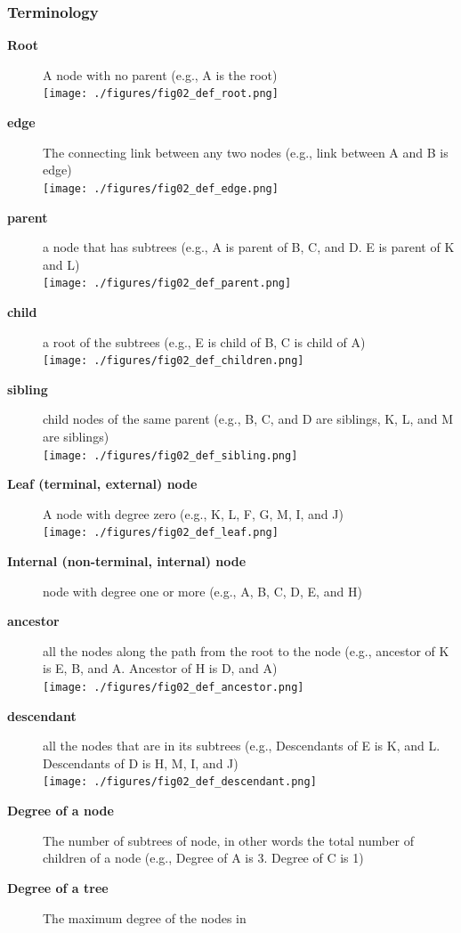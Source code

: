 \documentclass[newPxFont,sthlmFooter,nooffset]{beamer}
\begin{document}
\begin{frame}[t, allowframebreaks]
  \frametitle{Terminology}
  \begin{description}
  \item[\textbf{Root}] A node with no parent (e.g., A is the root)\\
\texttt{[image: ./figures/fig02\_def\_root.png]}
  \item[\textbf{edge}] The connecting link between any two nodes (e.g., link between A and B is edge)\\
\texttt{[image: ./figures/fig02\_def\_edge.png]}
  \item[\textbf{parent}] a node that has subtrees (e.g., A is parent of B, C, and D. E is parent of K and L)\\
\texttt{[image: ./figures/fig02\_def\_parent.png]}
  \item[\textbf{child}] a root of the subtrees (e.g., E is child of B, C is child of A)\\
\texttt{[image: ./figures/fig02\_def\_children.png]}
  \item[\textbf{sibling}] child nodes of the same parent (e.g., B, C, and D are siblings, K, L, and M are siblings)\\
\texttt{[image: ./figures/fig02\_def\_sibling.png]}
  \item[\textbf{Leaf (terminal, external) node}] A node with degree
    zero (e.g., K, L, F, G, M, I, and J)\\
\texttt{[image: ./figures/fig02\_def\_leaf.png]}
  \item[\textbf{Internal (non-terminal, internal) node}] node with
    degree one or more (e.g., A, B, C, D, E, and H)
  \item[\textbf{ancestor}] all the nodes along the path from the root
    to the node (e.g., ancestor of K is E, B, and A. Ancestor of H
    is D, and A)\\
\texttt{[image: ./figures/fig02\_def\_ancestor.png]}
  \item[\textbf{descendant}] all the nodes that are in its subtrees
    (e.g., Descendants of E is K, and L. Descendants of D is H,
    M, I, and J)\\
\texttt{[image: ./figures/fig02\_def\_descendant.png]}
  \item[\textbf{Degree of a node}] The number of subtrees of node, in
    other words the total number of children of a node (e.g., Degree
    of A is 3. Degree of C is 1)
  \item[\textbf{Degree of a tree}] The maximum degree of the nodes in

\end{description}
\end{frame}
\end{document}

